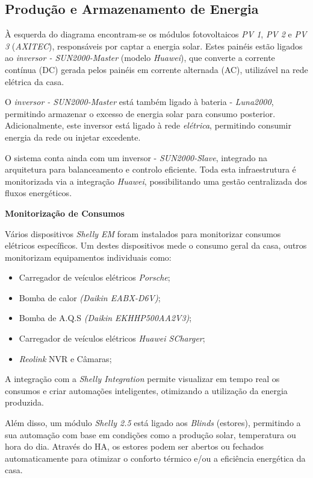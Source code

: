\subsection{Produção e Armazenamento de Energia}

À esquerda do diagrama encontram-se os módulos fotovoltaicos \textit{PV 1}, \textit{PV 2} e \textit{PV 3} (\textit{AXITEC}), responsáveis por captar a energia solar. Estes painéis estão ligados ao \textit{inversor - SUN2000-Master} (modelo \textit{Huawei}), que converte a corrente contínua (DC) gerada pelos painéis em corrente alternada (AC), utilizável na rede elétrica da casa.

O \textit{inversor - SUN2000-Master} está também ligado à bateria - \textit{Luna2000}, permitindo armazenar o excesso de energia solar para consumo posterior. Adicionalmente, este inversor está ligado à rede \textit{elétrica}, permitindo consumir energia da rede ou injetar excedente.

O sistema conta ainda com um inversor - \textit{SUN2000-Slave}, integrado na arquitetura para balanceamento e controlo eficiente. Toda esta infraestrutura é monitorizada via a integração \textit{Huawei}, possibilitando uma gestão centralizada dos fluxos energéticos.

\vspace{1em}
\textbf{Monitorização de Consumos}

Vários dispositivos \textit{Shelly EM} foram instalados para monitorizar consumos elétricos específicos. Um destes dispositivos mede o consumo geral da casa, outros monitorizam equipamentos individuais como:

\begin{itemize}
  \item Carregador de veículos elétricos \textit{Porsche};
  \item Bomba de calor \textit{(Daikin EABX-D6V)};
  \item Bomba de A.Q.S \textit{(Daikin EKHHP500AA2V3)};
  \item Carregador de veículos elétricos \textit{Huawei SCharger};
  \item \textit{Reolink} NVR e Câmaras;
\end{itemize}

A integração com a \textit{Shelly Integration} permite visualizar em tempo real os consumos e criar automações inteligentes, otimizando a utilização da energia produzida.

Além disso, um módulo \textit{Shelly 2.5} está ligado aos \textit{Blinds} (estores), permitindo a sua automação com base em condições como a produção solar, temperatura ou hora do dia. Através do \gls{HA}, os estores podem ser abertos ou fechados automaticamente para otimizar o conforto térmico e/ou a eficiência energética da casa.

